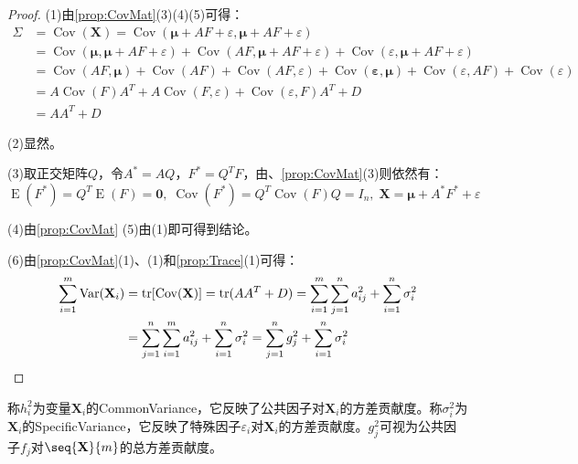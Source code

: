\begin{proof}
	(1)由\cref{prop:CovMat}(3)(4)(5)可得：
	\begin{align*}
		\Sigma&=\operatorname{Cov}(\mathbf{X})=\operatorname{Cov}(\boldsymbol{\mu}+AF+\varepsilon,\boldsymbol{\mu}+AF+\varepsilon) \\
		&=\operatorname{Cov}(\boldsymbol{\mu},\boldsymbol{\mu}+AF+\varepsilon)+\operatorname{Cov}(AF,\boldsymbol{\mu}+AF+\varepsilon)+\operatorname{Cov}(\varepsilon,\boldsymbol{\mu}+AF+\varepsilon) \\
		&=\operatorname{Cov}(AF,\boldsymbol{\mu})+\operatorname{Cov}(AF)+\operatorname{Cov}(AF,\varepsilon)+\operatorname{Cov}(\mathbf{\varepsilon},\boldsymbol{\mu})+\operatorname{Cov}(\varepsilon,AF)+\operatorname{Cov}(\varepsilon) \\
		&=A\operatorname{Cov}(F)A^T+A\operatorname{Cov}(F,\varepsilon)+\operatorname{Cov}(\varepsilon,F)A^T+D \\
		&=AA^T+D
	\end{align*}\par
	(2)显然。\par
	(3)取正交矩阵$Q$，令$A^*=AQ$，$F^*=Q^TF$，由、\cref{prop:CovMat}(3)则依然有：
	\begin{equation*}
		\operatorname{E}(F^*)=Q^T\operatorname{E}(F)=\mathbf{0},\;\operatorname{Cov}(F^*)=Q^T\operatorname{Cov}(F)Q=I_n,\;\mathbf{X}=\boldsymbol{\mu}+A^*F^*+\varepsilon
	\end{equation*}\par
	(4)由\cref{prop:CovMat}
	(5)由(1)即可得到结论。\par
	(6)由\cref{prop:CovMat}(1)、(1)和\cref{prop:Trace}(1)可得：
	\begin{align*}
		\sum_{i=1}^{m}\operatorname{Var}(\mathbf{X}_i)&=\operatorname{tr}[\operatorname{Cov}(\mathbf{X})]=\operatorname{tr}(AA^T+D)=\sum_{i=1}^{m}\sum_{j=1}^{n}a_{ij}^2+\sum_{i=1}^{n}\sigma_i^2 \\
		&=\sum_{j=1}^{n}\sum_{i=1}^{m}a_{ij}^2+\sum_{i=1}^{n}\sigma_i^2=\sum_{j=1}^{n}g_j^2+\sum_{i=1}^{n}\sigma_i^2\qedhere
	\end{align*}
\end{proof}
\begin{definition}
	称$h_i^2$为变量$\mathbf{X}_i$的\gls{CommonVariance}，它反映了公共因子对$\mathbf{X}_i$的方差贡献度。称$\sigma_i^2$为$\mathbf{X}_i$的\gls{SpecificVariance}，它反映了特殊因子$\varepsilon_i$对$\mathbf{X}_i$的方差贡献度。$g_j^2$可视为公共因子$f_j$对$\seq{\mathbf{X}}{m}$的总方差贡献度。
\end{definition}

